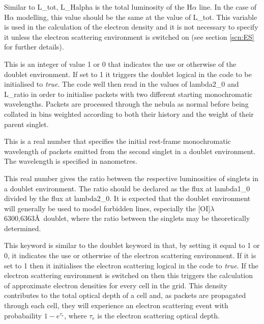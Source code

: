 
 Similar to L\_tot, L\_Halpha is the total luminosity of the H${\alpha}$ line.  In the case of H${\alpha}$ modelling, this value should be the same at the value of L\_tot.  This variable is used in the calculation of the electron density and it is not necessary to specify it unless the electron scattering environment is switched on (see section \ref{scn:ES} for further details).  


 This is an integer of value 1 or 0 that indicates the use or otherwise of the doublet environment.  If set to 1 it triggers the doublet logical in the code to be initialised to \textit{true}.  The code well then read in the values of {lambda2\_0} and {L\_ratio} in order to initialise packets with two different starting monochromatic wavelengths.  Packets are processed through the nebula as normal before being collated in bins weighted according to both their history and the weight of their parent singlet.


 This is a real number that specifies the initial rest-frame monochromatic wavelength of packets emitted from the second singlet in a doublet environment.  The wavelength is specified in nanometres.


 This real number gives the ratio between the respective luminosities of singlets in a doublet environment.  The ratio should be declared as the flux at lambda1\_0 divided by the flux at lambda2\_0.  It is expected that the doublet environment will generally be used to model forbidden lines, especially the [OI]$\lambda$6300,6363\AA\ doublet, where the ratio between the singlets may be theoretically determined.


 This keyword is similar to the doublet keyword in that, by setting it equal to 1 or 0, it indicates the use or otherwise of the electron scattering environment.  If it is set to 1 then it initialises the electron scattering logical in the code to \textit{true}.  If the electron scattering environment is switched on then this triggers the calculation of approximate electron densities for every cell in the grid.  This density contributes to the total optical depth of a cell and, as packets are propagated through each cell, they will experience an electron scattering event with probabaility $1-e^{\tau_e}$, where $\tau_e$ is the electron scattering optical depth.

